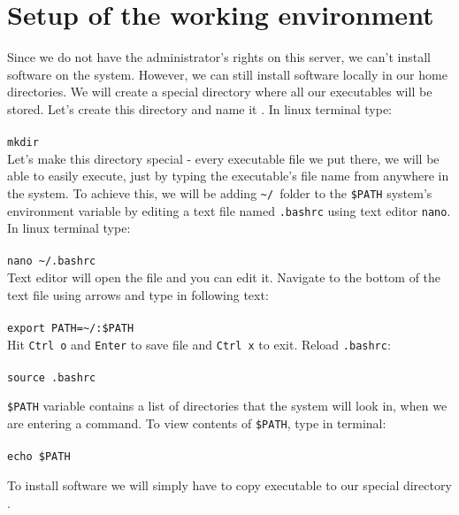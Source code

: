 \section{Setup of the working environment}
Since we do not have the administrator's rights on this server, we can't install
software on the system. However, we can still install software locally in our home
directories. We will create a special directory where all our executables will be stored.
Let's create this directory and name it \texttt{\binDir}. In linux terminal type:\\~\\
\texttt{mkdir \binDir}\\

Let's make this directory special - every executable file we put there, we will be able
to easily execute, just by typing the executable's file name from anywhere in the system.
To achieve this, we will be adding \texttt{\textasciitilde/\binDir}~folder to the \texttt{\$PATH} 
system's environment variable by editing a text file named \texttt{.bashrc} using text editor \texttt{nano}.
In linux terminal type:\\~\\
\texttt{nano \textasciitilde/.bashrc}\\

Text editor will open the file and you can edit it. Navigate to the bottom of the text file using arrows
and type in following text:\\~\\
\texttt{export PATH=\textasciitilde/\binDir:\$PATH}\\

Hit \texttt{Ctrl o} and \texttt{Enter} to save file and \texttt{Ctrl x} to exit.
Reload \texttt{.bashrc}:\\~\\%
\texttt{source .bashrc}\\

\begin{framed}
\texttt{\$PATH} variable contains a list of directories that the system will look in, when we are
entering a command. To view contents of \texttt{\$PATH}, type in terminal:\\~\\
\texttt{echo \$PATH}\\
\end{framed}
To install software we will simply have to copy executable to our special directory \texttt{\binDir}.

